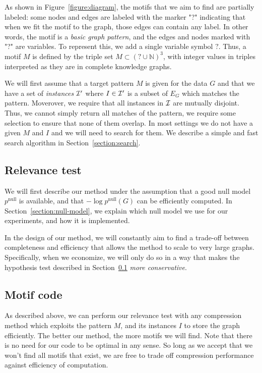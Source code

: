 \documentclass[11pt]{article}
\newcommand{\N}{{\mathbb N}}
\begin{document}
As shown in Figure~\ref{figure:diagram}, the motifs that we aim to find are partially labeled: some nodes and edges are labeled with the marker "?" indicating that when we fit the motif to the graph, those edges can contain any label. In other words, the motif is a \emph{basic graph pattern}, and the edges and nodes marked with "?" are variables. To represent this, we add a single variable symbol $?$. Thus, a motif $M$ is defined by the triple set $M \subset (? \cup \N) ^3$, with integer values in triples interpreted as they are in complete knowledge graphs.

We will first assume that a target pattern $M$ is given for the data $G$ and that we have a set of \emph{instances} $\cal I'$ where $I \in \cal I'$ is a subset of $E_G$ which matches the pattern. Moverover, we require that all instances in $\cal I$ are mutually disjoint. Thus, we cannot simply return all matches of the pattern, we require some selection to ensure that none of them overlap. In most settings we do not have a given $M$ and $I$ and we will need to search for them. We describe a simple and fast search algorithm in Section~\ref{section:search}.

\subsection{Relevance test}

\label{section:relevance-test}

We will first describe our method under the assumption that a good null model $p^\text{null}$ is available, and that $- \log p^\text{null}(G)$ can be efficiently computed. In Section~\ref{section:null-model}, we explain which null model we use for our experiments, and how it is implemented. 


In the design of our method, we will constantly aim to find a trade-off between completeness and efficiency that allows the method to scale to very large graphs. Specifically, when we economize, we will only do so in a way that makes the hypothesis test described in Section~\ref{section:relevance-test} \emph{more conservative}.

\subsection{Motif code}

As described above, we can perform our relevance test with any compression method which exploits the pattern $M$, and its instances $I$ to store the graph efficiently. The better our method, the more motifs we will find. Note that there is no need for our code to be optimal in any sense. So long as we accept that we won't find all motifs that exist, we are free to trade off compression performance against efficiency of computation.
\end{document}
